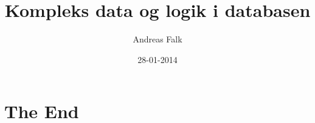 \documentclass[a4paper,twoside,10pt]{report}
\begin{document}

\title{Kompleks data og logik i databasen}
\author{Andreas Falk}
\date{28-01-2014} %
\maketitle



\tableofcontents %
\cleardoublepage %
\pagestyle{fancy} %


 





\chapter{The End}






\end{document}
